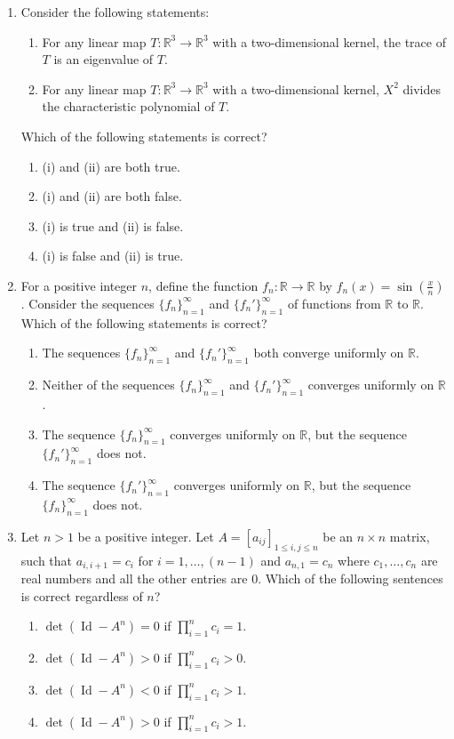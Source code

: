 \documentclass[11pt, a4paper]{article}
\begin{document}
\begin{enumerate}
  \item Consider the following statements:
  \begin{enumerate}[label=(\roman*)]
    \item For any linear map $T: \mathbb{R}^3 \to \mathbb{R}^3$ with a two-dimensional kernel, the trace of $T$ is an eigenvalue of $T$.
    \item For any linear map $T: \mathbb{R}^3 \to \mathbb{R}^3$ with a two-dimensional kernel, $X^2$ divides the characteristic polynomial of $T$.
  \end{enumerate}
  Which of the following statements is correct?
  \begin{enumerate}[label=(\alph*)]
    \item (i) and (ii) are both true.
    \item (i) and (ii) are both false.
    \item (i) is true and (ii) is false.
    \item (i) is false and (ii) is true.
  \end{enumerate}

  \item For a positive integer $n$, define the function $f_n: \mathbb{R} \to \mathbb{R}$ by $f_n(x) = \sin\left(\frac{x}{n}\right)$. Consider the sequences $\{f_n\}_{n=1}^\infty$ and $\{f_n'\}_{n=1}^\infty$ of functions from $\mathbb{R}$ to $\mathbb{R}$. Which of the following statements is correct?
  \begin{enumerate}[label=(\alph*)]
    \item The sequences $\{f_n\}_{n=1}^\infty$ and $\{f_n'\}_{n=1}^\infty$ both converge uniformly on $\mathbb{R}$.
    \item Neither of the sequences $\{f_n\}_{n=1}^\infty$ and $\{f_n'\}_{n=1}^\infty$ converges uniformly on $\mathbb{R}$.
    \item The sequence $\{f_n\}_{n=1}^\infty$ converges uniformly on $\mathbb{R}$, but the sequence $\{f_n'\}_{n=1}^\infty$ does not.
    \item The sequence $\{f_n'\}_{n=1}^\infty$ converges uniformly on $\mathbb{R}$, but the sequence $\{f_n\}_{n=1}^\infty$ does not.
  \end{enumerate}

  \item Let $n > 1$ be a positive integer. Let $A = [a_{ij}]_{1 \le i,j \le n}$ be an $n \times n$ matrix, such that $a_{i, i+1} = c_i$ for $i = 1, \dots, (n - 1)$ and $a_{n, 1} = c_n$ where $c_1, \dots, c_n$ are real numbers and all the other entries are $0$. Which of the following sentences is correct regardless of $n$?
  \begin{enumerate}[label=(\alph*)]
    \item $\det(\operatorname{Id} - A^n) = 0$ if $\prod_{i=1}^n c_i = 1$.
    \item $\det(\operatorname{Id} - A^n) > 0$ if $\prod_{i=1}^n c_i > 0$.
    \item $\det(\operatorname{Id} - A^n) < 0$ if $\prod_{i=1}^n c_i > 1$.
    \item $\det(\operatorname{Id} - A^n) > 0$ if $\prod_{i=1}^n c_i > 1$.
  \end{enumerate}


\end{enumerate}
\end{document}
